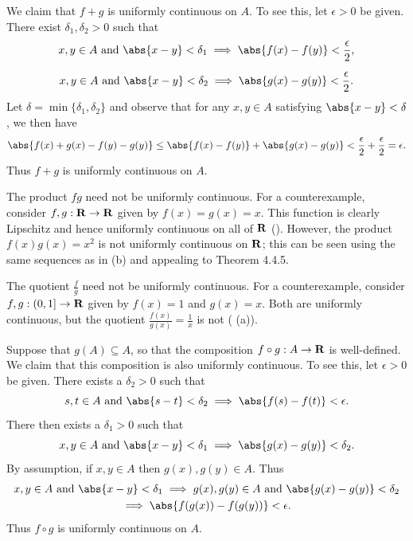 \documentclass{lew98_solutions}
\begin{document}
\begin{solution}
    We claim that \( f + g \) is uniformly continuous on \( A \). To see this, let \( \epsilon > 0 \) be given. There exist \( \delta_1, \delta_2 > 0 \) such that
    \begin{gather*}
        x, y \in A \text{ and } \abs{x - y} < \delta_1 \implies \abs{f(x) - f(y)} < \frac{\epsilon}{2}, \\[2mm]
        x, y \in A \text{ and } \abs{x - y} < \delta_2 \implies \abs{g(x) - g(y)} < \frac{\epsilon}{2}.
    \end{gather*}
    Let \( \delta = \min \{ \delta_1, \delta_2 \} \) and observe that for any \( x, y \in A \) satisfying \( \abs{x - y} < \delta \), we then have
    \[
        \abs{f(x) + g(x) - f(y) - g(y)} \leq \abs{f(x) - f(y)} + \abs{g(x) - g(y)} < \frac{\epsilon}{2} + \frac{\epsilon}{2} = \epsilon.
    \]
    Thus \( f + g \) is uniformly continuous on \( A \).

    The product \( fg \) need not be uniformly continuous. For a counterexample, consider \( f, g : \mathbf{R} \to \mathbf{R} \) given by \( f(x) = g(x) = x \). This function is clearly Lipschitz and hence uniformly continuous on all of \( \mathbf{R} \) (). However, the product \( f(x)g(x) = x^2 \) is not uniformly continuous on \( \mathbf{R} \); this can be seen using the same sequences as in  (b) and appealing to Theorem 4.4.5.

    The quotient \( \tfrac{f}{g} \) need not be uniformly continuous. For a counterexample, consider \( f, g : (0, 1] \to \mathbf{R} \) given by \( f(x) = 1 \) and \( g(x) = x \). Both are uniformly continuous, but the quotient \( \tfrac{f(x)}{g(x)} = \tfrac{1}{x} \) is not ( (a)).

    Suppose that \( g(A) \subseteq A \), so that the composition \( f \circ g : A \to \mathbf{R} \) is well-defined. We claim that this composition is also uniformly continuous. To see this, let \( \epsilon > 0 \) be given. There exists a \( \delta_2 > 0 \) such that
    \[
        s, t \in A \text{ and } \abs{s - t} < \delta_2 \implies \abs{f(s) - f(t)} < \epsilon.
    \]
    There then exists a \( \delta_1 > 0 \) such that
    \[
        x, y \in A \text{ and } \abs{x - y} < \delta_1 \implies \abs{g(x) - g(y)} < \delta_2.
    \]
    By assumption, if \( x, y \in A \) then \( g(x), g(y) \in A \). Thus
    \begin{multline*}
        x, y \in A \text{ and } \abs{x - y} < \delta_1 \implies g(x), g(y) \in A \text{ and } \abs{g(x) - g(y)} < \delta_2 \\
        \implies \abs{f(g(x)) - f(g(y))} < \epsilon.
    \end{multline*}
    Thus \( f \circ g \) is uniformly continuous on \( A \).
\end{solution}
\end{document}
